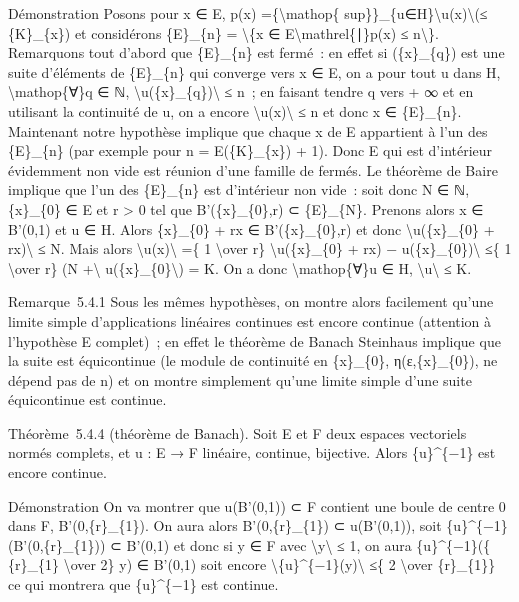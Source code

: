 \documentclass[]{article}
\begin{document}
Démonstration Posons pour x ∈ E, p(x) =\{\textbackslash{}mathop\{
sup\}\}\_\{u∈H\}\textbackslash{}\textbar{}u(x)\textbackslash{}\textbar{}(≤
\{K\}\_\{x\}) et considérons \{E\}\_\{n\} = \textbackslash{}\{x ∈
E\textbackslash{}mathrel\{∣\}p(x) ≤ n\textbackslash{}\}. Remarquons tout
d'abord que \{E\}\_\{n\} est fermé~: en effet si (\{x\}\_\{q\}) est une
suite d'éléments de \{E\}\_\{n\} qui converge vers x ∈ E, on a pour tout
u dans H, \textbackslash{}mathop\{∀\}q ∈ ℕ,
\textbackslash{}\textbar{}u(\{x\}\_\{q\})\textbackslash{}\textbar{} ≤
n~; en faisant tendre q vers + ∞ et en utilisant la continuité de u, on
a encore \textbackslash{}\textbar{}u(x)\textbackslash{}\textbar{} ≤ n et
donc x ∈ \{E\}\_\{n\}. Maintenant notre hypothèse implique que chaque x
de E appartient à l'un des \{E\}\_\{n\} (par exemple pour n =
E(\{K\}\_\{x\}) + 1). Donc E qui est d'intérieur évidemment non vide est
réunion d'une famille de fermés. Le théorème de Baire implique que l'un
des \{E\}\_\{n\} est d'intérieur non vide~: soit donc N ∈ ℕ,
\{x\}\_\{0\} ∈ E et r \textgreater{} 0 tel que B'(\{x\}\_\{0\},r) ⊂
\{E\}\_\{N\}. Prenons alors x ∈ B'(0,1) et u ∈ H. Alors \{x\}\_\{0\} +
rx ∈ B'(\{x\}\_\{0\},r) et donc \textbackslash{}\textbar{}u(\{x\}\_\{0\}
+ rx)\textbackslash{}\textbar{} ≤ N. Mais alors
\textbackslash{}\textbar{}u(x)\textbackslash{}\textbar{} =\{ 1
\textbackslash{}over r\} \textbackslash{}\textbar{}u(\{x\}\_\{0\} + rx)
− u(\{x\}\_\{0\})\textbackslash{}\textbar{} ≤\{ 1 \textbackslash{}over
r\} (N +\textbackslash{}\textbar{}
u(\{x\}\_\{0\}\textbackslash{}\textbar{}) = K. On a donc
\textbackslash{}mathop\{∀\}u ∈ H,
\textbackslash{}\textbar{}u\textbackslash{}\textbar{} ≤ K.

Remarque~5.4.1 Sous les mêmes hypothèses, on montre alors facilement
qu'une limite simple d'applications linéaires continues est encore
continue (attention à l'hypothèse E complet)~; en effet le théorème de
Banach Steinhaus implique que la suite est équicontinue (le module de
continuité en \{x\}\_\{0\}, η(ε,\{x\}\_\{0\}), ne dépend pas de n) et on
montre simplement qu'une limite simple d'une suite équicontinue est
continue.

Théorème~5.4.4 (théorème de Banach). Soit E et F deux espaces vectoriels
normés complets, et u : E → F linéaire, continue, bijective. Alors
\{u\}\^{}\{−1\} est encore continue.

Démonstration On va montrer que u(B'(0,1)) ⊂ F contient une boule de
centre 0 dans F, B'(0,\{r\}\_\{1\}). On aura alors B'(0,\{r\}\_\{1\}) ⊂
u(B'(0,1)), soit \{u\}\^{}\{−1\}(B'(0,\{r\}\_\{1\})) ⊂ B'(0,1) et donc
si y ∈ F avec \textbackslash{}\textbar{}y\textbackslash{}\textbar{} ≤ 1,
on aura \{u\}\^{}\{−1\}(\{ \{r\}\_\{1\} \textbackslash{}over 2\} y) ∈
B'(0,1) soit encore
\textbackslash{}\textbar{}\{u\}\^{}\{−1\}(y)\textbackslash{}\textbar{}
≤\{ 2 \textbackslash{}over \{r\}\_\{1\}\} ce qui montrera que
\{u\}\^{}\{−1\} est continue.
\end{document}
